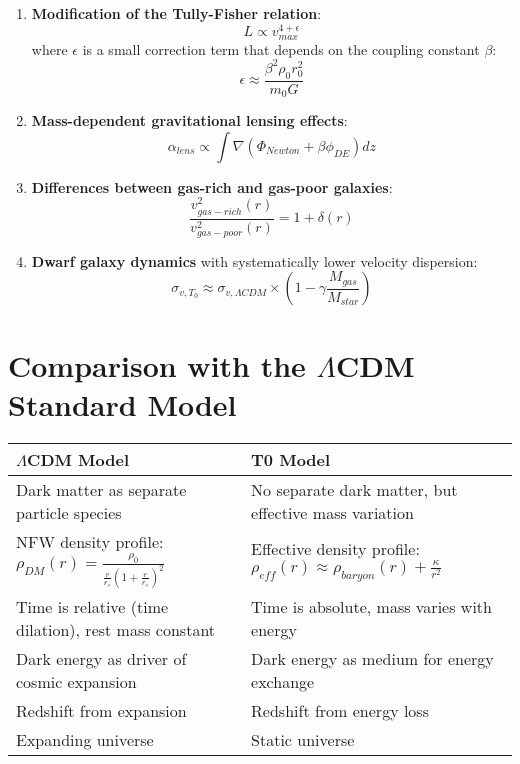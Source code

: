\documentclass[a4paper,12pt]{article}
\begin{document}
	\begin{enumerate}
		\item \textbf{Modification of the Tully-Fisher relation}:
		\begin{equation}
			L \propto v_{max}^{4+\epsilon}
		\end{equation}
		where $\epsilon$ is a small correction term that depends on the coupling constant $\beta$:
		\begin{equation}
			\epsilon \approx \frac{\beta^2 \rho_0 r_0^2}{m_0 G}
		\end{equation}
		
		\item \textbf{Mass-dependent gravitational lensing effects}:
		\begin{equation}
			\alpha_{lens} \propto \int \nabla(\Phi_{Newton} + \beta\phi_{DE}) dz
		\end{equation}
		
		\item \textbf{Differences between gas-rich and gas-poor galaxies}:
		\begin{equation}
			\frac{v^2_{gas-rich}(r)}{v^2_{gas-poor}(r)} = 1 + \delta(r)
		\end{equation}
		
		\item \textbf{Dwarf galaxy dynamics} with systematically lower velocity dispersion:
		\begin{equation}
			\sigma_{v,T_0} \approx \sigma_{v,\Lambda CDM} \times \left(1 - \gamma \frac{M_{gas}}{M_{star}}\right)
		\end{equation}
	\end{enumerate}
	
	\section{Comparison with the $\Lambda$CDM Standard Model}
	
	\begin{tcolorbox}[colback=yellow!5!white,colframe=yellow!75!black,title=Model Comparison]
		\begin{tabular}{p{}|p{}}
			\toprule
			\textbf{$\Lambda$CDM Model} & \textbf{T0 Model} \\
			\midrule
			Dark matter as separate particle species & No separate dark matter, but effective mass variation \\
			\midrule
			NFW density profile: $\rho_{DM}(r) = \frac{\rho_0}{\frac{r}{r_s}(1 + \frac{r}{r_s})^2}$ & Effective density profile: $\rho_{eff}(r) \approx \rho_{baryon}(r) + \frac{\kappa}{r^2}$ \\
			\midrule
			Time is relative (time dilation), rest mass constant & Time is absolute, mass varies with energy \\
			\midrule
			Dark energy as driver of cosmic expansion & Dark energy as medium for energy exchange \\
			\midrule
			Redshift from expansion & Redshift from energy loss \\
			\midrule
			Expanding universe & Static universe \\
			\bottomrule
		\end{tabular}
	\end{tcolorbox}
	
\end{document}
